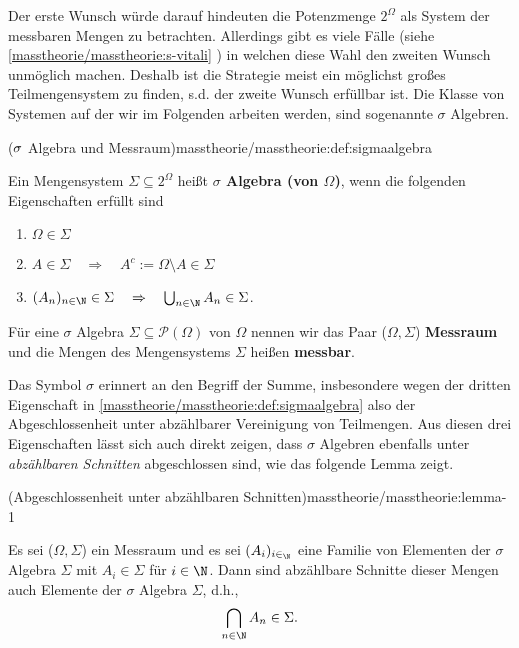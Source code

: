 \documentclass[letterpaper,10pt,german]{jupyterBook}
\begin{document}
\par
Der erste Wunsch würde darauf hindeuten die Potenzmenge \(2^\Omega\) als System der messbaren Mengen zu betrachten. Allerdings gibt es viele Fälle (siehe \cref{masstheorie/masstheorie:s-vitali} ) in welchen diese Wahl den zweiten Wunsch unmöglich machen. Deshalb ist die Strategie meist ein möglichst großes Teilmengensystem zu finden, s.d. der zweite Wunsch erfüllbar ist. Die Klasse von Systemen auf der wir im Folgenden arbeiten werden, sind sogenannte \(\sigma\) Algebren.
\begin{definition}{(\protect\(\sigma\protect\) Algebra und Messraum)}{masstheorie/masstheorie:def:sigmaalgebra}



\par
Ein Mengensystem \(\Sigma \subseteq 2^\Omega\) heißt \textbf{\(\sigma\) Algebra (von \(\Omega\))}, wenn die folgenden Eigenschaften erfüllt sind
\begin{enumerate}

\item {} 
\par
\(\Omega\in \Sigma\)

\item {} 
\par
\(A\in \Sigma \quad \Rightarrow \quad A^c:=\Omega \setminus A\in \Sigma\)

\item {} 
\par
\((A_n)_{n\in\N} \in \Sigma \quad \Rightarrow \quad \bigcup_{n\in \N} A_n\in \Sigma\).

\end{enumerate}

\par
Für eine \(\sigma\) Algebra \(\Sigma \subseteq \mathcal{P}(\Omega)\) von \(\Omega\) nennen wir das Paar (\(\Omega,\Sigma\)) \textbf{Messraum} und die Mengen des Mengensystems \(\Sigma\) heißen \textbf{messbar}.
\end{definition}

\par
Das Symbol \(\sigma\) erinnert an den Begriff der Summe, insbesondere wegen der dritten Eigenschaft in \cref{masstheorie/masstheorie:def:sigmaalgebra}  also der Abgeschlossenheit unter abzählbarer Vereinigung von Teilmengen.
Aus diesen drei Eigenschaften lässt sich auch direkt zeigen, dass \(\sigma\) Algebren ebenfalls unter \emph{abzählbaren Schnitten} abgeschlossen sind, wie das folgende Lemma zeigt.
\begin{lemma}{(Abgeschlossenheit unter abzählbaren Schnitten)}{masstheorie/masstheorie:lemma-1}



\par
Es sei (\(\Omega,\Sigma\)) ein Messraum und es sei \((A_i)_{i\in_\N}\) eine Familie von Elementen der \(\sigma\) Algebra \(\Sigma\) mit \(A_i \in \Sigma\) für \(i \in \N\).
Dann sind abzählbare Schnitte dieser Mengen auch Elemente der \(\sigma\) Algebra \(\Sigma\), d.h.,
\begin{align*}
\bigcap_{n \in \N} A_n \in \Sigma.
\end{align*}\end{lemma}
\end{document}
